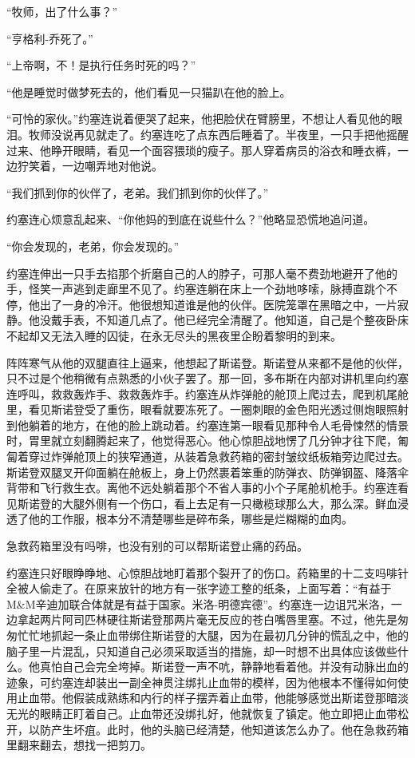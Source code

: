     “牧师，出了什么事？”

    “亨格利-乔死了。”

    “上帝啊，不！是执行任务时死的吗？”

    “他是睡觉时做梦死去的，他们看见一只猫趴在他的脸上。

    “可怜的家伙。”约塞连说着便哭了起来，他把脸伏在臂膀里，不想让人看见他的眼泪。牧师没说再见就走了。约塞连吃了点东西后睡着了。半夜里，一只手把他摇醒过来、他睁开眼睛，看见一个面容猥琐的瘦子。那人穿着病员的浴衣和睡衣裤，一边狞笑着，一边嘲弄地对他说。

    “我们抓到你的伙伴了，老弟。我们抓到你的伙伴了。”

    约塞连心烦意乱起来、“你他妈的到底在说些什么？”他略显恐慌地追问道。

    “你会发现的，老弟，你会发现的。”

    约塞连伸出一只手去掐那个折磨自己的人的脖子，可那人毫不费劲地避开了他的手，怪笑一声逃到走廊里不见了。约塞连躺在床上一个劲地哆嗦，脉搏直跳个不停，他出了一身的冷汗。他很想知道谁是他的伙伴。医院笼罩在黑暗之中，一片寂静。他没戴手表，不知道几点了。他已经完全清醒了。他知道，自己是个整夜卧床不起却又无法入睡的囚徒，在永无尽头的黑夜里企盼着黎明的到来。

    阵阵寒气从他的双腿直往上逼来，他想起了斯诺登。斯诺登从来都不是他的伙伴，只不过是个他稍微有点熟悉的小伙子罢了。那一回，多布斯在内部对讲机里向约塞连呼叫，救救轰炸手、救救轰炸手。约塞连从炸弹舱的舱顶上爬过去，爬到机尾舱里，看见斯诺登受了重伤，眼看就要冻死了。一圈刺眼的金色阳光透过侧炮眼照射到他躺着的地方，在他的脸上跳动着。约塞连第一眼看见那种令人毛骨悚然的情景时，胃里就立刻翻腾起来了，他觉得恶心。他心惊胆战地愣了几分钟才往下爬，匍匐着穿过炸弹舱顶上的狭窄通道，从装着急救药箱的密封皱纹纸板箱旁边爬过去。斯诺登双腿叉开仰面躺在舱板上，身上仍然裹着笨重的防弹衣、防弹钢盔、降落伞背带和飞行救生衣。离他不远处躺着那个不省人事的小个子尾舱机枪手。约塞连看见斯诺登的大腿外侧有一个伤口，看上去足有一只橄榄球那么大，那么深。鲜血浸透了他的工作服，根本分不清楚哪些是碎布条，哪些是烂糊糊的血肉。

    急救药箱里没有吗啡，也没有别的可以帮斯诺登止痛的药品。

    约塞连只好眼睁睁地、心惊胆战地盯着那个裂开了的伤口。药箱里的十二支吗啡针全被人偷走了。在原来放针的地方有一张字迹工整的纸条，上面写着：“有益于M&M辛迪加联合体就是有益于国家。米洛-明德宾德”。约塞连一边诅咒米洛，一边拿起两片阿司匹林硬往斯诺登那两片毫无反应的苍白嘴唇里塞。不过，他先是匆匆忙忙地抓起一条止血带绑住斯诺登的大腿，因为在最初几分钟的慌乱之中，他的脑子里一片混乱，只知道自己必须采取适当的措施，却一时想不出具体应该做些什么。他真怕自己会完全垮掉。斯诺登一声不吭，静静地看着他。并没有动脉出血的迹象，可约塞连却装出一副全神贯注绑扎止血带的模样，因为他根本不懂得如何使用止血带。他假装成熟练和内行的样子摆弄着止血带，他能够感觉出斯诺登那暗淡无光的眼睛正盯着自己。止血带还没绑扎好，他就恢复了镇定。他立即把止血带松开，以防产生坏疽。此时，他的头脑已经清楚，他知道该怎么办了。他在急救药箱里翻来翻去，想找一把剪刀。

